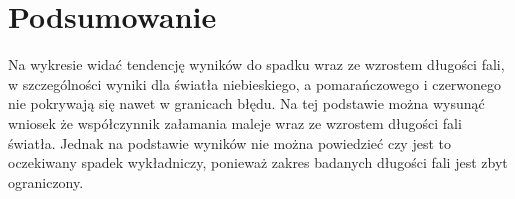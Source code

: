 \documentclass[a4paper,10pt,twoside]{article}
\begin{document}
\newpage
\section{Podsumowanie}
Na wykresie widać tendencję wyników do spadku wraz ze wzrostem długości fali, w szczególności wyniki dla światła
niebieskiego, a pomarańczowego i czerwonego nie pokrywają się nawet w granicach błędu.
Na tej podstawie można wysunąć wniosek że współczynnik załamania maleje wraz ze wzrostem długości fali światła.
Jednak na podstawie wyników nie można powiedzieć czy jest to oczekiwany spadek wykładniczy, ponieważ zakres badanych
długości fali jest zbyt ograniczony.
\end{document}
